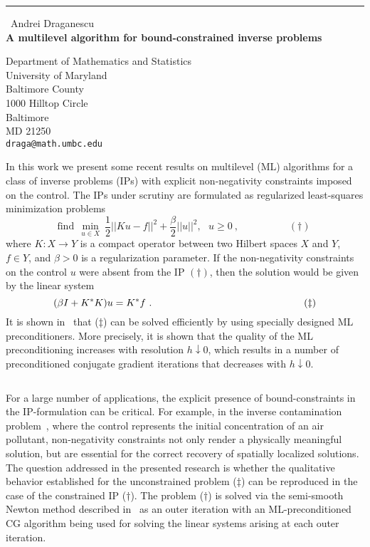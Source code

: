 \documentclass{report}
\begin{document}
\begin{center}
\rule{6in}{1pt} \
{\large Andrei Draganescu \\
{\bf A multilevel algorithm for bound-constrained inverse problems}}

Department of Mathematics and Statistics \\ University of Maryland \\ Baltimore County \\ 1000 Hilltop Circle \\ Baltimore \\ MD 21250
\\
{\tt draga@math.umbc.edu}\end{center}

\noindent In this work we present some recent results on multilevel
(ML) algorithms for a class of inverse problems (IPs) with explicit
non-negativity constraints imposed on the control. The IPs under
scrutiny are formulated as regularized least-squares minimization
problems
$$\mathrm{find}\ \ \min_{u\in X}\ \frac{1}{2}|\!| Ku - f |\!|^2 +
\frac{\beta}{2}|\!|u|\!|^2,\ \ \ u\ge 0\ ,\ \hspace{2cm}(\dagger)\ $$
where $K:X\rightarrow Y$ is a compact operator between two Hilbert
spaces $X$ and $Y$, $f\in Y$, and $\beta>0$ is a regularization
parameter. If the non-negativity constraints on the control $u$ were
absent from the IP $(\dagger)$, then the solution would be given by
the linear system
$$(\beta I+ K^* K)u = K^* f\ . \hspace{5.4cm}(\ddagger)$$ It is
shown in~\cite{dradup} that ($\ddagger$) can be solved efficiently by
using specially designed ML preconditioners. More precisely, it is
shown that the quality of the ML preconditioning increases with
resolution $h\downarrow 0$, which results in a number of preconditioned conjugate
gradient iterations that decreases with $h\downarrow 0$.

${ }$

\noindent For a large number of applications, the explicit presence of
bound-constraints in the IP-formulation can be critical. For example,
in the inverse contamination problem~\cite{sc05}, where the control
represents the initial concentration of an air pollutant,
non-negativity constraints not only render a physically meaningful
solution, but are essential for the correct recovery of spatially
localized solutions. The question addressed in the presented research
is whether the qualitative behavior established for the unconstrained
problem ($\ddagger$) can be reproduced in the case of the constrained
IP ($\dagger$). The problem ($\dagger$) is solved via the semi-smooth Newton
method described in~\cite{hint_ito_kun} as an outer iteration with an
ML-preconditioned CG algorithm being used for solving the linear systems
arising at each outer iteration.
\end{document}
